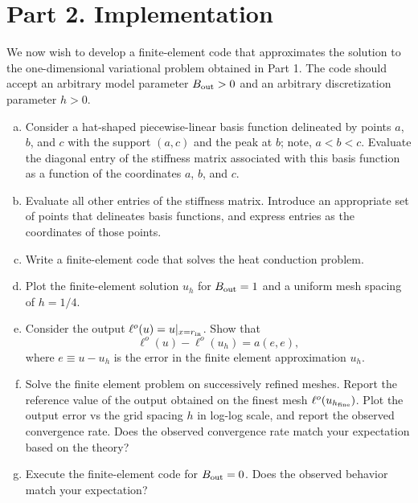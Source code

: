 \documentclass[preprint,11pt]{article}
\begin{document}
\section*{Part 2. Implementation}
We now wish to develop a finite-element code that approximates the solution to the one-dimensional variational problem obtained in Part 1. The code should accept an arbitrary model parameter $B_{\rm out} > 0$ and an arbitrary discretization parameter $h > 0$.  
\begin{enumerate}[(a)]
\item Consider a hat-shaped piecewise-linear basis function delineated by points $a$, $b$, and $c$ with the support $(a,c)$ and the peak at $b$; note, $a < b < c$.  Evaluate the diagonal entry of the stiffness matrix associated with this basis function as a function of the coordinates $a$, $b$, and $c$.
\item Evaluate all other entries of the stiffness matrix.  Introduce an appropriate set of points that delineates basis functions, and express entries as the coordinates of those points.
\item Write a finite-element code that solves the heat conduction problem.
\item Plot the finite-element solution $u_h$ for $B_{\rm out} = 1$ and a uniform mesh spacing of $h = 1/4$.  
\item Consider the output $\ell^{o}(u) = u|_{x = r_{\rm in}}$. Show that
  \begin{equation*}
    \ell^o(u) - \ell^o(u_h) = a(e,e),
  \end{equation*}
  where $e \equiv u - u_h$ is the error in the finite element approximation $u_h$.  
\item Solve the finite element problem on successively refined meshes. Report the reference value of the output obtained on the finest mesh $\ell^o(u_{h_{\rm fine}})$.  Plot the output error vs the grid spacing $h$ in log-log scale, and report the observed convergence rate.  Does the observed convergence rate match your expectation based on the theory?
\item Execute the finite-element code for $B_{\rm out} = 0$.  %
  Does the observed behavior match your expectation?
\end{enumerate}
\end{document}
